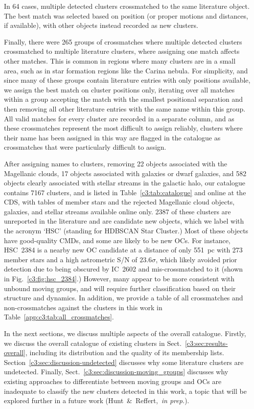 In 64 cases, multiple detected clusters crossmatched to the same literature object. The best match was selected based on position (or proper motions and distances, if available), with other objects instead recorded as new clusters.

Finally, there were 265 groups of crossmatches where multiple detected clusters crossmatched to multiple literature clusters, where assigning one match affects other matches. This is common in regions where many clusters are in a small area, such as in star formation regions like the Carina nebula. For simplicity, and since many of these groups contain literature entries with only positions available, we assign the best match on cluster positions only, iterating over all matches within a group accepting the match with the smallest positional separation and then removing all other literature entries with the same name within this group. All valid matches for every cluster are recorded in a separate column, and as these crossmatches represent the most difficult to assign reliably, clusters where their name has been assigned in this way are flagged in the catalogue as crossmatches that were particularly difficult to assign.

After assigning names to clusters, removing 22 objects associated with the Magellanic clouds, 17 objects associated with galaxies or dwarf galaxies, and 582 objects clearly associated with stellar streams in the galactic halo, our catalogue contains 7167 clusters, and is listed in Table~\ref{c3:tab:catalogue} and online at the CDS, with tables of member stars and the rejected Magellanic cloud objects, galaxies, and stellar streams available online only. 2387 of these clusters are unreported in the literature and are candidate new objects, which we label with the acronym `HSC' (standing for HDBSCAN Star Cluster.) Most of these objects have good-quality CMDs, and some are likely to be new OCs. For instance, HSC~2384 is a nearby new OC candidate at a distance of only 551~pc with 273 member stars and a high astrometric S/N of $23.6\sigma$, which likely avoided prior detection due to being obscured by IC~2602 and mis-crossmatched to it (shown in Fig.~\ref{c3:fig:hsc_2384}.) However, many appear to be more consistent with unbound moving groups, and will require further classification based on their structure and dynamics. In addition, we provide a table of all crossmatches and non-crossmatches against the clusters in this work in Table~\ref{app:c3:tab:all_crossmatches}.

In the next sections, we discuss multiple aspects of the overall catalogue. Firstly, we discuss the overall catalogue of existing clusters in Sect.~\ref{c3:sec:results-overall}, including its distribution and the quality of its membership lists. Section~\ref{c3:sec:discussion-undetected} discusses why some literature clusters are undetected. Finally, Sect.~\ref{c3:sec:discussion-moving_groups} discusses why existing approaches to differentiate between moving groups and OCs are inadequate to classify the new clusters detected in this work, a topic that will be explored further in a future work (Hunt~\&~Reffert,~\emph{in prep.}).


